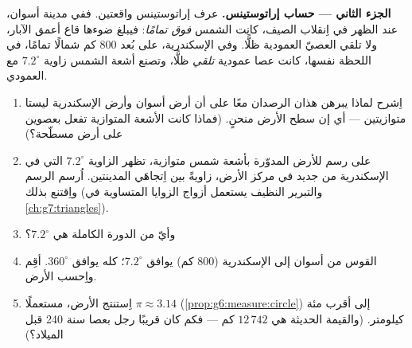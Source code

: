 \begin{problem}
\medskip
\noindent\textbf{الجزء الثاني --- حساب إراتوستينس.}
عرف إراتوستينس واقعتين. ففي مدينة أسوان، عند الظهر في
اِنقلاب الصيف، كانت الشمس \emph{فوق  تمامًا}: فيبلغ ضوءها
قاع أعمق الآبار، ولا تلقي العصيّ العمودية
ظلًّا. وفي الإسكندرية، على بُعد $800$ كم شمالًا تمامًا، في اللحظة نفسها،
كانت عصا عمودية \emph{تلقي} ظلًّا، وتصنع أشعة الشمس
زاوية $7.2^\circ$ مع العمودي.
\begin{enumerate}[resume]
  \item اِشرح لماذا يبرهن هذان الرصدان معًا على أن
        أرض أسوان وأرض الإسكندرية ليستا
        متوازيتين --- أي إن سطح الأرض منحنٍ.
        (فماذا كانت الأشعة المتوازية تفعل بعصوين على أرض
        مسطّحة؟)
  \item على رسم للأرض المدوّرة بأشعة شمس متوازية،
        تظهر الزاوية $7.2^\circ$ التي في الإسكندرية من جديد في مركز
        الأرض، زاويةً بين اِتجاهَي
        المدينتين. اُرسم الرسم واِقتنع بذلك (والتبرير
        النظيف يستعمل أزواج الزوايا المتساوية في
        \cref{ch:g7:triangles}).
  \item وأيّ  من الدورة الكاملة هي $7.2^\circ$؟
  \item القوس من أسوان إلى الإسكندرية ($800$ كم) يوافق
        $7.2^\circ$؛  كله يوافق
        $360^\circ$. أقِم  واِحسب
         الأرض.
  \item اِستنتج  الأرض، مستعملًا $\pi \approx
        3.14$ (\cref{prop:g6:measure:circle})  إلى
        أقرب مئة كيلومتر. (والقيمة الحديثة هي
        $12\,742$ كم --- فكم كان قريبًا رجل بعصا
        سنة 240 قبل الميلاد؟)
\end{enumerate}


\end{problem}
